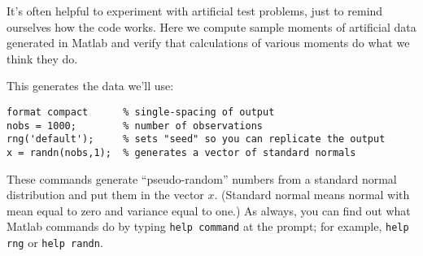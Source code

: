\documentclass[11pt]{exam}
\begin{document}
\begin{questions}
It's often helpful to experiment with artificial test problems,
just to remind ourselves how the code works.
Here we compute sample moments of artificial data generated in Matlab
and verify that calculations of various moments do what we think they do.

This generates the data we'll use:
\begin{verbatim}
format compact      % single-spacing of output
nobs = 1000;        % number of observations
rng('default');     % sets "seed" so you can replicate the output
x = randn(nobs,1);  % generates a vector of standard normals
\end{verbatim}
These commands generate ``pseudo-random'' numbers from a
standard normal distribution and put them in the vector $x$.
(Standard normal means normal with mean equal to zero and variance equal to one.)
As always, you can find out what Matlab commands do by typing
{\tt help command} at the prompt;
for example, {\tt help rng} or {\tt help randn}.


\begin{solution}
\begin{parts}

\end{parts}
\end{solution}
\end{questions}
\end{document}
